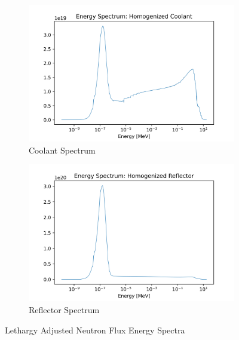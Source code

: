 \begin{figure}[h!]
\begin{subfigure}{0.25\textwidth}
  \includegraphics[width=0.95\linewidth]{figures/cool_spec_homog}
  \caption{Coolant Spectrum}
  \label{fig:hom-cool}
\end{subfigure}%
%
\begin{subfigure}{0.25\textwidth}
  \includegraphics[width=0.95\linewidth]{figures/reflect_spec_homog}
  \caption{Reflector Spectrum}
  \label{fig:hom-reflec}
\end{subfigure}%
%

\caption{Lethargy Adjusted Neutron Flux Energy Spectra}
\label{fig:hom-spec}
\end{figure}